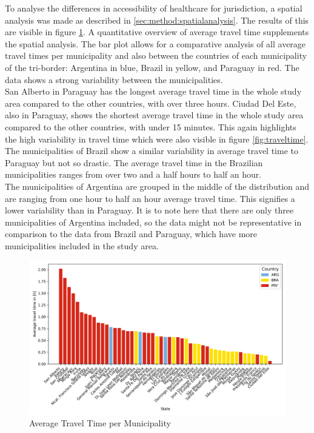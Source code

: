 \documentclass[11pt, a4paper]{report}
\begin{document}
To analyse the differences in accessibility of healthcare for jurisdiction, a spatial analysis was made as described in \ref{sec:method:spatialanalysis}. The results of this are visible in figure \ref{fig:traveltimestatesplot}. A quantitative overview of average travel time supplements the spatial analysis. The bar plot allows for a comparative analysis of all average travel times per municipality and also between the countries of each municipality of the tri-border: Argentina in blue, Brazil in yellow, and Paraguay in red. The data shows a strong variability between the municipalities.  \\
%
San Alberto in Paraguay has the longest average travel time in the whole study area compared to the other countries, with over three hours. Ciudad Del Este, also in Paraguay, shows the shortest average travel time in the whole study area compared to the other countries, with under 15 minutes. This again highlights the high variability in travel time which were also visible in figure \ref{fig:traveltime}.  \\
%
The municipalities of Brazil show a similar variability in average travel time to Paraguay but not so drastic. The average travel time in the Brazilian municipalities ranges from over two and a half hours to half an hour.\\
%
The municipalities of Argentina are grouped in the middle of the distribution and are ranging from one hour to half an hour average travel time. This signifies a lower variability than in Paraguay. It is to note here that there are only three municipalities of Argentina included, so the data might not be representative in comparison to the data from Brazil and Paraguay, which have more municipalities included in the study area. 

\begin{figure}[H]
  \centering
  \includegraphics[width=0.9\linewidth]{figures/states.png}
  \caption{Average Travel Time per Municipality}
  \label{fig:traveltimestatesplot}
\end{figure}
\end{document}
